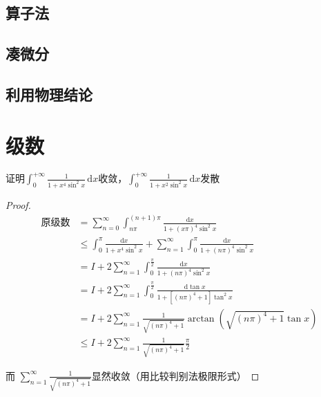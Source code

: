 \section{算子法}

\section{凑微分}

\section{利用物理结论}


\chapter{级数}

\begin{example}
证明$\displaystyle \int_{0}^{+\infty} \frac{1}{1+x^4\sin^2 x} \,\mathrm{d}x$收敛，$\displaystyle \int_{0}^{+\infty} \frac{1}{1+x^2\sin^2 x}\,\mathrm{d}x $发散
\end{example}

\begin{proof}
\begin{align*}
\text{原级数}
&=\sum\limits_{n=0}^{\infty}\int_{n\pi}^{(n+1)\pi}\frac{\mathrm{d}x}{1+(x\pi)^4\sin^2 x}\\
& \le \int_{0}^{\pi} \frac{\mathrm{d}x}{1+x^4\sin^2 x}+\sum\limits_{n=1}^{\infty}\int_{0}^{\pi}\frac{\mathrm{d}x}{1+(n\pi)^4\sin^2 x} \\
&=I +  2\sum\limits_{n=1}^{\infty}\int_{0}^{\frac{\pi}{2}}\frac{\mathrm{d}x}{1+(n\pi)^4\sin^2 x}\\
&=I + 2\sum\limits_{n=1}^{\infty}\int_{0}^{\frac{\pi}{2}}\frac{\mathrm{d}\tan x}{1+[(n\pi)^4+1]\tan^2 x}\\
&=I + 2 \sum\limits_{n=1}^{\infty} \frac{1}{\sqrt{(n\pi)^4 +1}} \arctan (\sqrt{(n\pi)^4+1} \tan x)\\
&\le I+2\sum\limits_{n=1}^{\infty} \frac{1}{\sqrt{(n\pi)^4 +1}} \frac{\pi}{2}
\end{align*}

而 $\displaystyle \sum\limits_{n=1}^{\infty} \frac{1}{\sqrt{(n\pi)^4 +1}}$显然收敛（用比较判别法极限形式）
\end{proof}